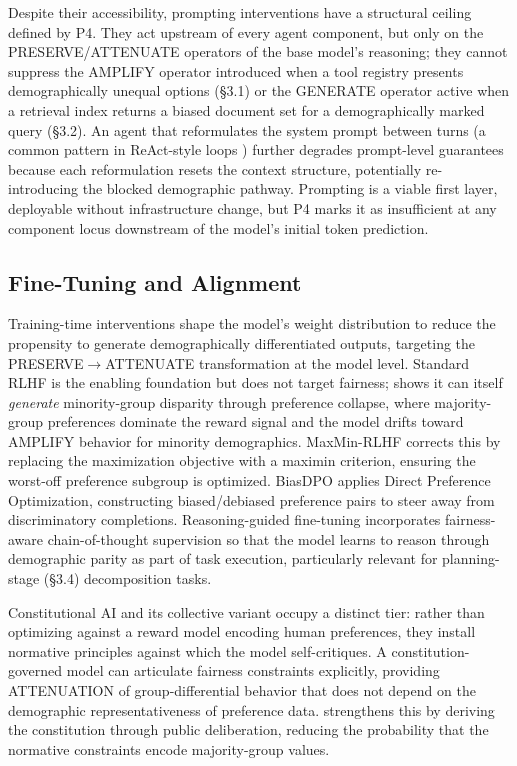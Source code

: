\documentclass[acmsmall,nonacm]{acmart}
\begin{document}
Despite their accessibility, prompting interventions have a structural ceiling defined by P4. They act upstream of every agent component, but only on the PRESERVE/ATTENUATE operators of the base model's reasoning; they cannot suppress the AMPLIFY operator introduced when a tool registry presents demographically unequal options (\S{}3.1) or the GENERATE operator active when a retrieval index returns a biased document set for a demographically marked query (\S{}3.2). An agent that reformulates the system prompt between turns (a common pattern in ReAct-style loops \cite{yao2023react}) further degrades prompt-level guarantees because each reformulation resets the context structure, potentially re-introducing the blocked demographic pathway. Prompting is a viable first layer, deployable without infrastructure change, but P4 marks it as insufficient at any component locus downstream of the model's initial token prediction.

\subsection{Fine-Tuning and Alignment}

Training-time interventions shape the model's weight distribution to reduce the propensity to generate demographically differentiated outputs, targeting the PRESERVE$\rightarrow$ATTENUATE transformation at the model level. Standard RLHF \cite{ouyang2022training} is the enabling foundation but does not target fairness; \cite{xiao2024algorithmic} shows it can itself \emph{generate} minority-group disparity through preference collapse, where majority-group preferences dominate the reward signal and the model drifts toward AMPLIFY behavior for minority demographics. MaxMin-RLHF \cite{chakraborty2024maxmin} corrects this by replacing the maximization objective with a maximin criterion, ensuring the worst-off preference subgroup is optimized. BiasDPO \cite{allam2024biasdpo} applies Direct Preference Optimization, constructing biased/debiased preference pairs to steer away from discriminatory completions. Reasoning-guided fine-tuning \cite{kabra2025reasoning} incorporates fairness-aware chain-of-thought supervision so that the model learns to reason through demographic parity as part of task execution, particularly relevant for planning-stage (\S{}3.4) decomposition tasks.

Constitutional AI \cite{bai2022constitutional} and its collective variant \cite{huang2024collective} occupy a distinct tier: rather than optimizing against a reward model encoding human preferences, they install normative principles against which the model self-critiques. A constitution-governed model can articulate fairness constraints explicitly, providing ATTENUATION of group-differential behavior that does not depend on the demographic representativeness of preference data. \cite{huang2024collective} strengthens this by deriving the constitution through public deliberation, reducing the probability that the normative constraints encode majority-group values.
\end{document}
